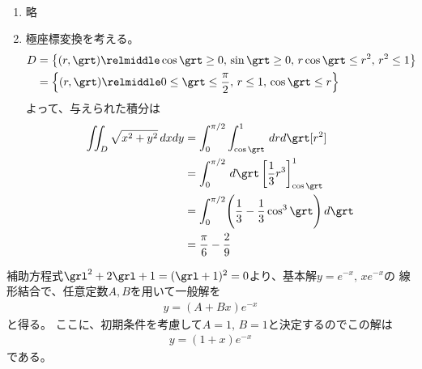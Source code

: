 \begin{ans*}
  ${}$
  \begin{enumerate}[label=(\arabic*)]
    \item 略 %

    \item 極座標変換を考える。
    \begin{align}
      D
      &= \left\{(r,\grt)\relmiddle \cos\grt\geq 0,\, \sin\grt\geq 0,\, r\cos\grt\leq r^2,\, r^2\leq 1\right\} \\
      &= \left\{(r,\grt)\relmiddle 0\leq \grt\leq \frac{\pi}{2},\, r\leq 1,\, \cos\grt \leq r\right\}
    \end{align}
    よって、与えられた積分は
    \begin{align}
      \iint_D \sqrt{x^2+y^2}\,dxdy
      &= \int_{0}^{\pi/2}\int_{\cos\grt}^{1}\, drd\grt [r^2] \\
      &= \int_{0}^{\pi/2}\,d\grt \left[ \frac{1}{3}r^3 \right]_{\cos\grt}^{1} \\
      &= \int_{0}^{\pi/2} \Biggl( \frac{1}{3} - \frac{1}{3}\cos^3\grt \Biggr)\, d\grt \\
      &= \frac{\pi}{6} - \frac{2}{9}
    \end{align}
  \end{enumerate}
\end{ans*}

\begin{ans*}
  補助方程式$\grl^2+2\grl+1 = (\grl + 1)^2 = 0$より、基本解$y = e^{-x},\,xe^{-x}$の
  線形結合で、任意定数$A,B$を用いて一般解を
  \begin{gather}
    y = (A+Bx)e^{-x}
  \end{gather}
  と得る。
  ここに、初期条件を考慮して$A = 1,\,B = 1$と決定するのでこの解は
  \begin{gather}
    y = (1+x)e^{-x}
  \end{gather}
  である。
\end{ans*}

